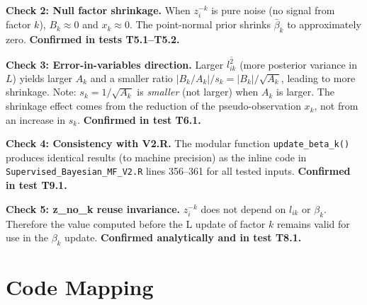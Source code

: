 \documentclass[11pt]{article}
\begin{document}
\begin{verifybox}
\textbf{Check 2: Null factor shrinkage.}
When $z_i^{-k}$ is pure noise (no signal from factor $k$), $B_k \approx 0$
and $x_k \approx 0$.  The point-normal prior shrinks $\bar{\beta}_k$ to
approximately zero.  \textbf{Confirmed in tests T5.1--T5.2.}
\end{verifybox}

\begin{verifybox}
\textbf{Check 3: Error-in-variables direction.}
Larger $\overline{l^2_{ik}}$ (more posterior variance in $L$) yields larger
$A_k$ and a smaller ratio $|B_k/A_k|/s_k = |B_k|/\sqrt{A_k}$, leading to
more shrinkage.  Note: $s_k = 1/\sqrt{A_k}$ is \emph{smaller} (not larger)
when $A_k$ is larger.  The shrinkage effect comes from the reduction of the
pseudo-observation $x_k$, not from an increase in $s_k$.
\textbf{Confirmed in test T6.1.}
\end{verifybox}

\begin{verifybox}
\textbf{Check 4: Consistency with V2.R.}
The modular function \texttt{update\_beta\_k()} produces identical results
(to machine precision) as the inline code in
\texttt{Supervised\_Bayesian\_MF\_V2.R} lines 356--361 for all tested inputs.
\textbf{Confirmed in test T9.1.}
\end{verifybox}

\begin{verifybox}
\textbf{Check 5: z\_no\_k reuse invariance.}
$z_i^{-k}$ does not depend on $l_{ik}$ or $\beta_k$.  Therefore the value
computed before the L update of factor $k$ remains valid for use in the
$\beta_k$ update.  \textbf{Confirmed analytically and in test T8.1.}
\end{verifybox}

\section{Code Mapping}\label{sec:code}
\end{document}
